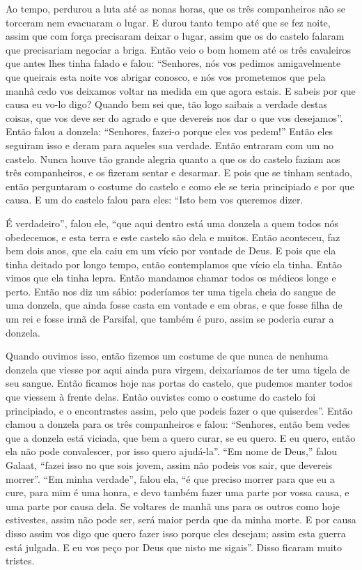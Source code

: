 Ao tempo, perdurou a luta até as nonas horas, que os três companheiros não se
torceram nem evacuaram o lugar. E durou tanto tempo até que se fez noite, assim
que com força precisaram deixar o lugar, assim que os do castelo falaram que
precisariam negociar a briga. Então veio o bom homem até os três cavaleiros que
antes lhes tinha falado e falou: “Senhores, nós vos pedimos amigavelmente que
queirais esta noite vos abrigar conosco, e nós vos prometemos que pela manhã
cedo vos deixamos voltar na medida em que agora estais. E sabeis por que causa
eu vo-lo digo? Quando bem sei que, tão logo saibais a verdade destas coisas,
que vos deve ser do agrado e que devereis nos dar o que vos desejamos”. Então
falou a donzela: “Senhores, fazei-o porque eles vos pedem!” Então eles
seguiram isso e deram para aqueles sua verdade. Então entraram com um no
castelo. Nunca houve tão grande alegria quanto a que os do castelo faziam aos
três companheiros, e os fizeram sentar e desarmar. E pois que se tinham
sentado, então perguntaram o costume do castelo e como ele se teria principiado
e por que causa. E um do castelo falou para eles: “Isto bem vos queremos
dizer.

É verdadeiro”, falou ele, “que aqui dentro está uma donzela a quem todos nós
obedecemos, e esta terra e este castelo são dela e muitos. Então aconteceu, faz
bem dois anos, que ela caiu em um vício por vontade de Deus. E pois que ela
tinha deitado por longo tempo, então contemplamos que vício ela tinha. Então
vimos que ela tinha lepra. Então mandamos chamar todos os médicos longe e
perto. Então nos diz um sábio: poderíamos ter uma tigela cheia do sangue de uma
donzela, que ainda fosse casta em vontade e em obras, e que fosse filha de um
rei e fosse irmã de Parsifal, que também é puro, assim se poderia curar a
donzela.

Quando ouvimos isso, então fizemos um costume de que nunca de nenhuma donzela
que viesse por aqui ainda pura virgem, deixaríamos de ter uma tigela de seu
sangue. Então ficamos hoje nas portas do castelo, que pudemos manter todos que
viessem à frente delas. Então ouvistes como o costume do castelo foi
principiado, e o encontrastes assim, pelo que podeis fazer o que quiserdes”.
Então clamou a donzela para os três companheiros e falou: “Senhores, então bem
vedes que a donzela está viciada, que bem a quero curar, se eu quero. E eu
quero, então ela não pode convalescer, por isso quero ajudá-la”. “Em nome de
Deus,” falou Galaat, “fazei isso no que sois jovem, assim não podeis vos sair,
que devereis morrer”. “Em minha verdade”, falou ela, “é que preciso morrer para
que eu a cure, para mim é uma honra, e devo também fazer uma parte por vossa
causa, e uma parte por causa dela. Se voltares de manhã uns para os outros como
hoje estivestes, assim não pode ser, será maior perda que da minha morte. E por
causa disso assim vos digo que quero fazer isso porque eles desejam; assim esta
guerra está julgada. E eu vos peço por Deus que nisto me sigais”. Disso ficaram
muito tristes.

